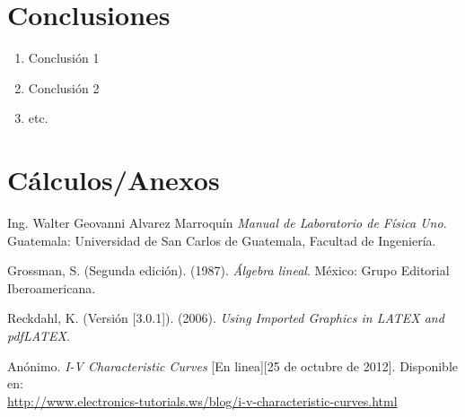 \documentclass[osajnl,twocolumn,showpacs,superscriptaddress,10pt]{revtex4-1}
\begin{document}
\section{Conclusiones}

\begin{enumerate}
\item Conclusión 1
\item Conclusión 2
\item etc.
\end{enumerate}

\section{Cálculos/Anexos}

\begin{thebibliography}{99}

\bibitem{} Ing. Walter Geovanni Alvarez Marroquín \textit{Manual de Laboratorio de Física Uno}. Guatemala: Universidad de San Carlos de Guatemala, Facultad de Ingeniería.

\bibitem{} Grossman, S. (Segunda edición). (1987). \textit{Álgebra lineal}. México: Grupo Editorial Iberoamericana.

\bibitem{} Reckdahl, K. (Versión [3.0.1]). (2006).\textit{ Using Imported Graphics in LATEX and pdfLATEX}.

\bibitem{}Anónimo.\textit{ I-V Characteristic Curves} [En linea][25 de octubre de 2012]. Disponible en:\\ \url{http://www.electronics-tutorials.ws/blog/i-v-characteristic-curves.html}
\end{thebibliography}
\end{document}
